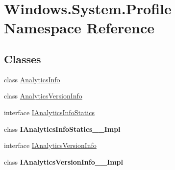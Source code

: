 \hypertarget{namespace_windows_1_1_system_1_1_profile}{}\section{Windows.\+System.\+Profile Namespace Reference}
\label{namespace_windows_1_1_system_1_1_profile}
\subsection*{Classes}
\begin{DoxyCompactItemize}
\item 
class \hyperlink{class_windows_1_1_system_1_1_profile_1_1_analytics_info}{Analytics\+Info}
\item 
class \hyperlink{class_windows_1_1_system_1_1_profile_1_1_analytics_version_info}{Analytics\+Version\+Info}
\item 
interface \hyperlink{interface_windows_1_1_system_1_1_profile_1_1_i_analytics_info_statics}{I\+Analytics\+Info\+Statics}
\item 
class {\bfseries I\+Analytics\+Info\+Statics\+\_\+\+\_\+\+Impl}
\item 
interface \hyperlink{interface_windows_1_1_system_1_1_profile_1_1_i_analytics_version_info}{I\+Analytics\+Version\+Info}
\item 
class {\bfseries I\+Analytics\+Version\+Info\+\_\+\+\_\+\+Impl}
\end{DoxyCompactItemize}
